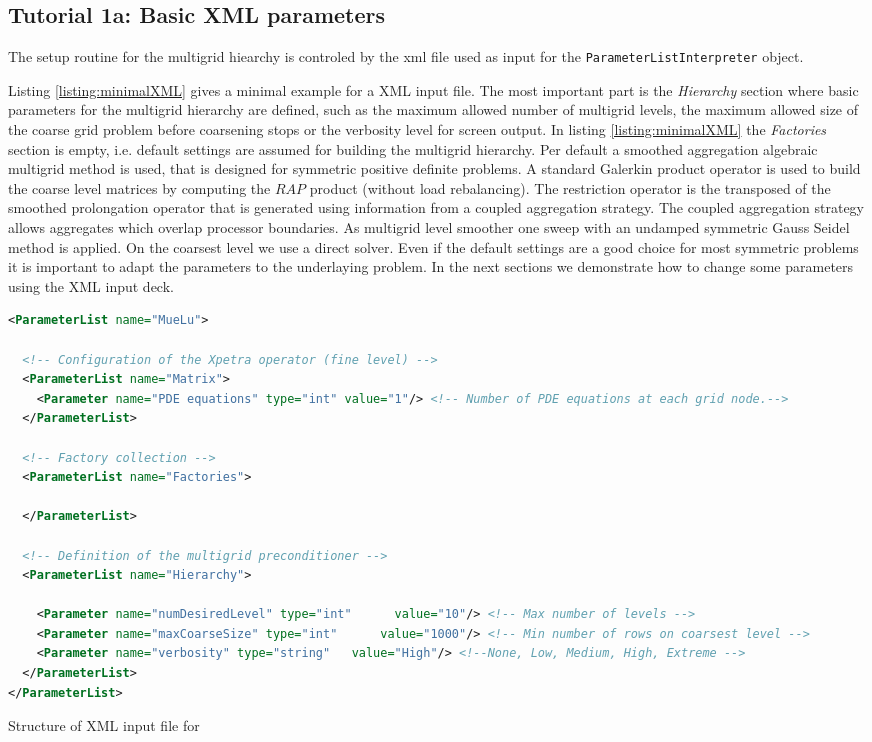 \subsection{Tutorial 1a: Basic XML parameters}
The setup routine for the multigrid hiearchy is controled by the xml file used as input for the \verb|ParameterListInterpreter| object.

Listing \ref{listing:minimalXML} gives a minimal example for a \MueLu XML input file. The most important part is the \textit{Hierarchy} section where basic parameters for the multigrid hierarchy are defined, such as the maximum allowed number of multigrid levels, the maximum allowed size of the coarse grid problem before coarsening stops or the verbosity level for screen output. In listing \ref{listing:minimalXML} the \textit{Factories} section is empty, i.e. default settings are assumed for building the multigrid hierarchy.
Per default a smoothed aggregation algebraic multigrid method is used, that is designed for symmetric positive definite problems. A standard Galerkin product operator is used to build the coarse level matrices by computing the $RAP$ product (without load rebalancing). The restriction operator is the transposed of the smoothed prolongation operator that is generated using information from a coupled aggregation strategy. The coupled aggregation strategy allows aggregates which overlap processor boundaries. As multigrid level smoother one sweep with an undamped symmetric Gauss Seidel method is applied. On the coarsest level we use a direct solver.
Even if the default settings are a good choice for most symmetric problems it is important to adapt the parameters to the underlaying problem. In the next sections we demonstrate how to change some parameters using the XML input deck.
\begin{Listing}
\begin{center}
\begin{lstlisting}[language=XML,label=listing:minimalXML]
<ParameterList name="MueLu">

  <!-- Configuration of the Xpetra operator (fine level) -->
  <ParameterList name="Matrix">
    <Parameter name="PDE equations" type="int" value="1"/> <!-- Number of PDE equations at each grid node.-->
  </ParameterList>

  <!-- Factory collection -->
  <ParameterList name="Factories">

  </ParameterList>

  <!-- Definition of the multigrid preconditioner -->
  <ParameterList name="Hierarchy">

    <Parameter name="numDesiredLevel" type="int"      value="10"/> <!-- Max number of levels -->
    <Parameter name="maxCoarseSize" type="int"      value="1000"/> <!-- Min number of rows on coarsest level -->
    <Parameter name="verbosity" type="string"   value="High"/> <!--None, Low, Medium, High, Extreme -->
  </ParameterList>
</ParameterList>

\end{lstlisting}
\caption{Structure of XML input file for \MueLu}
\label{listing:minimalXML}
\end{center}
\end{Listing}

